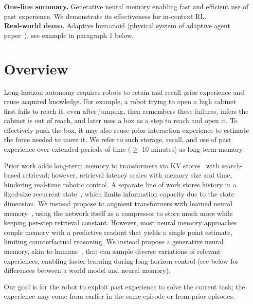 \noindent
\textbf{One-line summary.} Generative neural memory enabling fast and efficient use of past experience. We demonstrate its effectiveness for in-context RL.\\
\textbf{Real-world demo.} Adaptive humanoid (physical system of adaptive agent paper~\cite{team2023human}), see example in paragraph 1 below.

\section{Overview}
Long-horizon autonomy requires robots to retain and recall prior experience and reuse acquired knowledge. For example, a robot trying to open a high cabinet first fails to reach it, even after jumping, then remembers these failures, infers the cabinet is out of reach, and later uses a box as a step to reach and open it. To effectively push the box, it may also reuse prior interaction experience to estimate the force needed to move it. We refer to such storage, recall, and use of past experience over extended periods of time ($\geq$ 10 minutes) as long-term memory.

Prior work adds long-term memory to transformers via KV stores~\cite{wu2022memorizing,borgeaud2022improving, vennerod2021long} with search-based retrieval; however, retrieval latency scales with memory size and time, hindering real-time robotic control. A separate line of work stores history in a fixed-size recurrent state~\cite{dai2019transformer,bulatov2022recurrent,rodkin2024associative,munkhdalai2024leave,xiao2023efficient,gu2024mamba,vennerod2021long}, which limits information capacity due to the state dimension.
We instead propose to augment transformers with learned neural memory~\cite{behrouz2024titans,sun2024learning}, using the network itself as a compressor to store much more while keeping per-step retrieval constant.
However, most neural memory approaches couple memory with a predictive readout that yields a single point estimate, limiting counterfactual reasoning. We instead propose a generative neural memory, akin to humans~\cite{spens2024generative,bennett2023brief}, that can sample diverse variations of relevant experiences, enabling faster learning during long-horizon control (see below for differences between a world model and neural memory).

Our goal is for the robot to exploit past experience to solve the current task; the experience may come from earlier in the same episode or from prior episodes.

